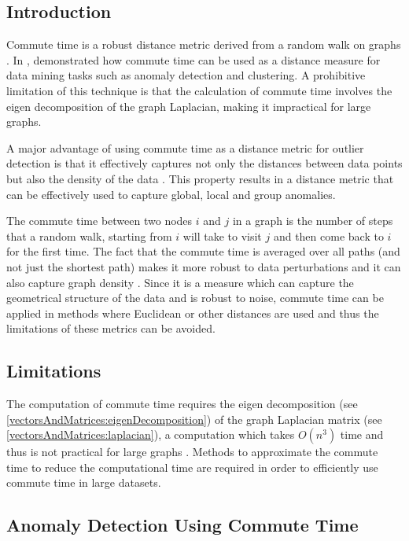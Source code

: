 \subsection{Introduction}
\label{commuteTime:introduction}
Commute time is a robust distance metric derived from a random walk on graphs
\cite{Khoa:2012}. In , \citeauthor{Khoa:2012} demonstrated
how commute time can be used as a distance measure for data mining tasks such as
anomaly detection and clustering. A prohibitive limitation of this technique is
that the calculation of commute time involves the eigen decomposition of the
graph Laplacian, making it impractical for large graphs.

A major advantage of using commute time as a distance metric for outlier
detection is that it effectively captures not only the distances between data
points but also the density of the data \citeNeeded. This property results in a
distance metric that can be effectively used to capture global, local and group
anomalies.

The commute time between two nodes $i$ and $j$ in a graph is the number of steps
that a random walk, starting from $i$ will take to visit $j$ and then come back
to $i$ for the first time. The fact that the commute time is averaged over all
paths (and not just the shortest path) makes it more robust to data
perturbations and it can also capture graph density \cite{Khoa:2012}. Since it
is a measure which can capture the geometrical structure of the data and is
robust to noise, commute time can be applied in methods where Euclidean or other
distances are used and thus the limitations of these metrics can be avoided.

\subsection{Limitations}
\label{commuteTime:limitations}
The computation of commute time requires the eigen decomposition (see
\autoref{vectorsAndMatrices:eigenDecomposition}) of the graph Laplacian matrix 
(see \autoref{vectorsAndMatrices:laplacian}), a computation which takes
$O(n^{3})$ time and thus is not practical for large graphs \citeNeeded. Methods
to approximate the commute time to reduce the computational time are required in
order to efficiently use commute time in large datasets.

\subsection{Anomaly Detection Using Commute Time}
\label{commuteTime:anomalyDetection}
